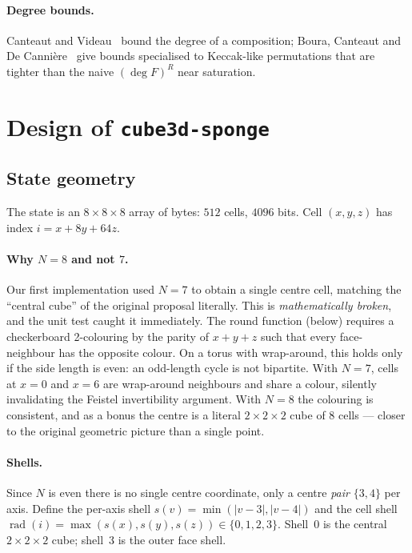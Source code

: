 \documentclass[11pt,a4paper]{article}
\theoremstyle{plain}
\theoremstyle{definition}
\theoremstyle{remark}
\begin{document}
\paragraph{Degree bounds.} Canteaut and Videau~\cite{canteaut02} bound the degree of a
composition; Boura, Canteaut and De Cannière~\cite{boura11} give bounds specialised to
Keccak-like permutations that are tighter than the naive $(\deg F)^R$ near saturation.

\section{Design of \texttt{cube3d-sponge}}
\label{sec:design}

\subsection{State geometry}

The state is an $8\times8\times8$ array of bytes: $512$ cells, $4096$ bits. Cell
$(x,y,z)$ has index $i = x + 8y + 64z$.

\paragraph{Why $N=8$ and not $7$.} Our first implementation used $N=7$ to obtain a
single centre cell, matching the ``central cube'' of the original proposal literally.
This is \emph{mathematically broken}, and the unit test caught it immediately. The
round function (below) requires a checkerboard 2-colouring by the parity of $x+y+z$
such that every face-neighbour has the opposite colour. On a torus with wrap-around,
this holds only if the side length is even: an odd-length cycle is not bipartite. With
$N=7$, cells at $x=0$ and $x=6$ are wrap-around neighbours and share a colour,
silently invalidating the Feistel invertibility argument. With $N=8$ the colouring is
consistent, and as a bonus the centre is a literal $2\times2\times2$ cube of 8 cells
--- closer to the original geometric picture than a single point.

\paragraph{Shells.} Since $N$ is even there is no single centre coordinate, only a
centre \emph{pair} $\{3,4\}$ per axis. Define the per-axis shell
$s(v) = \min(|v-3|,|v-4|)$ and the cell shell
$\operatorname{rad}(i) = \max(s(x),s(y),s(z)) \in \{0,1,2,3\}$. Shell~0 is the central
$2\times2\times2$ cube; shell~3 is the outer face shell.
\end{document}

